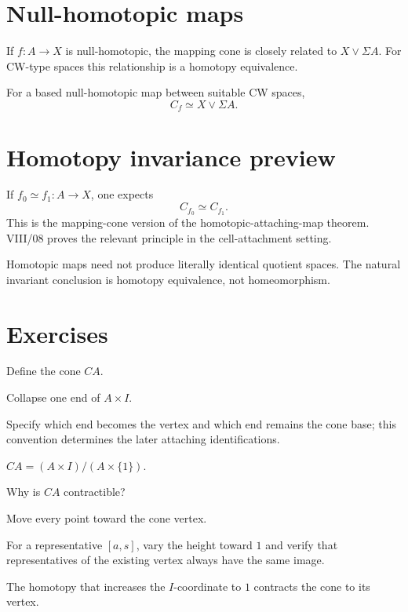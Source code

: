 \section{Null-homotopic maps}

If \(f:A\to X\) is null-homotopic, the mapping cone is closely related to
\(X\vee\Sigma A\).  For CW-type spaces this relationship is a homotopy
equivalence.

\begin{theorem}
\label{thm:viii07-null-splitting}
For a based null-homotopic map between suitable CW spaces,
\[
C_f\simeq X\vee\Sigma A.
\]
\end{theorem}

\section{Homotopy invariance preview}

If \(f_0\simeq f_1:A\to X\), one expects
\[
C_{f_0}\simeq C_{f_1}.
\]
This is the mapping-cone version of the homotopic-attaching-map theorem.
VIII/08 proves the relevant principle in the cell-attachment setting.

\begin{warning}
\label{warn:viii07-homeomorphic}
Homotopic maps need not produce literally identical quotient spaces.  The
natural invariant conclusion is homotopy equivalence, not homeomorphism.
\end{warning}


\section{Exercises}

\begin{exercise}\label{exr:viii07-01}
Define the cone \(CA\).
\end{exercise}
\begin{hint}
Collapse one end of \(A\times I\).

Specify which end becomes the vertex and which end remains the cone base; this convention determines the later attaching identifications.
\end{hint}
\begin{solution}
\(CA=(A\times I)/(A\times\{1\})\).
\end{solution}

\begin{exercise}\label{exr:viii07-02}
Why is \(CA\) contractible?
\end{exercise}
\begin{hint}
Move every point toward the cone vertex.

For a representative \([a,s]\), vary the height toward \(1\) and verify that representatives of the existing vertex always have the same image.
\end{hint}
\begin{solution}
The homotopy that increases the \(I\)-coordinate to \(1\) contracts the cone to its vertex.
\end{solution}


